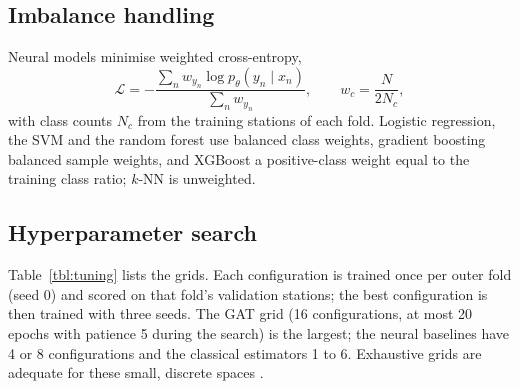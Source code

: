 \documentclass[a4paper,fleqn]{cas-dc}
\begin{document}
\subsection{Imbalance handling}\label{sec:weight}
Neural models minimise weighted cross-entropy,
\begin{equation}
\mathcal{L}=-\frac{\sum_{n}w_{y_n}\log p_\theta(y_n\mid x_n)}{\sum_n w_{y_n}},\qquad
w_c=\frac{N}{2N_c},
\end{equation}
with class counts $N_c$ from the training stations of each fold. Logistic regression,
the SVM and the random forest use balanced class weights, gradient boosting balanced
sample weights, and XGBoost a positive-class weight equal to the training class ratio;
$k$-NN is unweighted.

\subsection{Hyperparameter search}\label{sec:tuning}
Table~\ref{tbl:tuning} lists the grids. Each configuration is trained once per outer
fold (seed 0) and scored on that fold's validation stations; the best configuration is
then trained with three seeds. The GAT grid (16 configurations, at most 20 epochs with
patience 5 during the search) is the largest; the neural baselines have 4 or 8
configurations and the classical estimators 1 to 6. Exhaustive grids are adequate for
these small, discrete spaces \citep{bergstra2012}.
\end{document}
